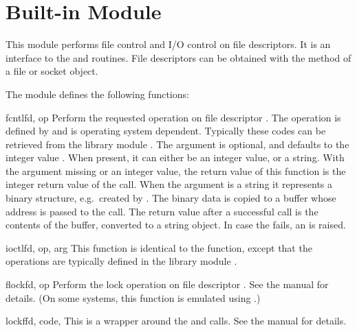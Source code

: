 \section{Built-in Module }
\label{module-fcntl}

This module performs file control and I/O control on file descriptors.
It is an interface to the  and 
\UNIX{} routines.  File descriptors can be obtained with the
 method of a file or socket object.

The module defines the following functions:


\begin{funcdesc}{fcntl}{fd, op}
  Perform the requested operation on file descriptor .
  The operation is defined by  and is operating system
  dependent.  Typically these codes can be retrieved from the library
  module . The argument 
  is optional, and defaults to the integer value .  When
  present, it can either be an integer value, or a string.  With
  the argument missing or an integer value, the return value of this
  function is the integer return value of the \C{} 
  call.  When the argument is a string it represents a binary
  structure, e.g.\ created by . The binary
  data is copied to a buffer whose address is passed to the \C{}
   call.  The return value after a successful call
  is the contents of the buffer, converted to a string object.  In
  case the  fails, an  is
  raised.
\end{funcdesc}

\begin{funcdesc}{ioctl}{fd, op, arg}
  This function is identical to the  function, except
  that the operations are typically defined in the library module
  .
\end{funcdesc}

\begin{funcdesc}{flock}{fd, op}
Perform the lock operation  on file descriptor .
See the \UNIX{} manual  for details.  (On some
systems, this function is emulated using .)
\end{funcdesc}

\begin{funcdesc}{lockf}{fd, code, }
This is a wrapper around the  and
  calls.  See the \UNIX{}
manual for details.
\end{funcdesc}

